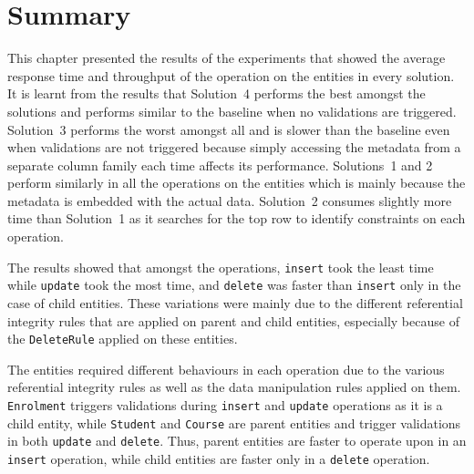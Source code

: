 \section{Summary} \label{s:results-summary}

This chapter presented the results of the experiments that showed the average
response time and throughput of the operation on the entities in every solution.
 It is learnt from the results that Solution~4 performs the best amongst the
solutions and performs similar to the baseline when no validations are
triggered.
Solution~3 performs the worst amongst all and is slower than the baseline even
when validations are not triggered because simply accessing the metadata from a
separate column family each time affects its performance.
Solutions~1 and 2 perform similarly in all the operations on the entities which
is mainly because the metadata is embedded with the actual data.  Solution~2
consumes slightly more time than Solution~1 as it searches for the top row to
identify constraints on each operation.

The results showed that amongst the operations,  \texttt{insert} took the least
time while \texttt{update} took the most time,  and \texttt{delete} was faster
than \texttt{insert} only in the case of child entities.  These variations were
mainly due to the different referential integrity rules that are applied on
parent and child entities,  especially because of the \texttt{DeleteRule}
applied on these entities. 

The entities required different behaviours in each operation due to the various
referential integrity rules as well as  the data manipulation rules applied on
them. 
\texttt{Enrolment} triggers validations during \texttt{insert}
 and \texttt{update} operations as it is a child entity,  while
\texttt{Student} and \texttt{Course} are parent entities and trigger validations in both
\texttt{update} and \texttt{delete}.  Thus,  parent entities are faster to operate
upon in an \texttt{insert} operation,  while child entities are faster only in a
\texttt{delete} operation.  
	